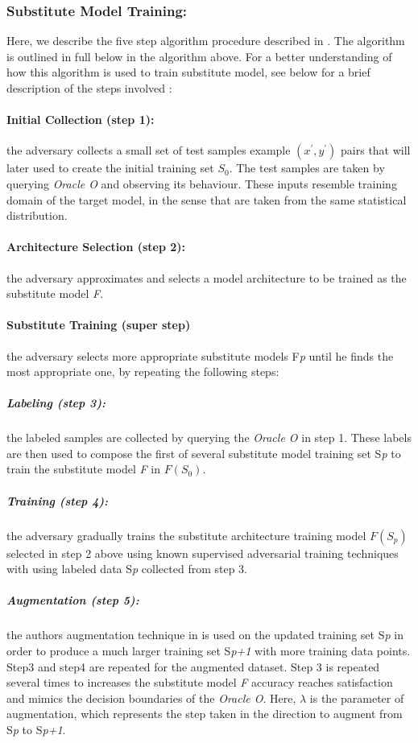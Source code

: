 \documentclass[grad,lot,lof,11pt,oneside,onehalfspace]{RUthesis}
\begin{document}
\subsubsection*{Substitute Model Training:} Here, we describe the five step algorithm procedure described in \cite{papernot_practical_2017}. The algorithm is outlined in full below in the algorithm above. For a better understanding of how this algorithm is used to train substitute model, see below for a brief description of the steps involved \cite{papernot_practical_2017}:
\paragraph{Initial Collection (step 1):} the adversary collects a small set of test samples example $(x^{'},y^{'})$ pairs that will later used to create the initial training set $S_{0}$. The test samples are taken by querying \textit{Oracle O} and observing its behaviour. These inputs resemble training domain of the target model, in the sense that are taken from the same statistical distribution.
\paragraph{Architecture Selection (step 2):} the adversary approximates and selects a model architecture to be trained as the substitute model \textit{F}.
\paragraph{Substitute Training (super step)} the adversary selects more appropriate substitute models F{\textit{p}} until he finds the most appropriate one, by repeating the following steps:
\subparagraph{Labeling (step 3):} the labeled samples are collected by querying the \textit{Oracle O} in step 1. These labels are then used to compose the first of several substitute model training set S{\textit{p}} to train the substitute model \textit{F} in \textit{$F(S_{0})$}.
\subparagraph{Training (step 4):} the adversary gradually trains the substitute architecture training model \textit{$F(S_{p})$} selected in step 2 above using known supervised adversarial training techniques with using labeled data S{\textit{p}} collected from step 3. 
\subparagraph{Augmentation (step 5):} the authors augmentation technique in \cite{papernot_practical_2017} is used on the updated training set S{\textit{p}} in order to produce a much larger training set S{\textit{p+1}} with more training data points. Step3 and step4 are repeated for the augmented dataset.  Step 3 is repeated several times to increases the substitute model \textit{F} accuracy reaches satisfaction and mimics the decision boundaries of the \textit{Oracle O}. Here, $\lambda$ is the parameter of augmentation, which represents the step taken in the direction to augment from S{\textit{p}} to S{\textit{p+1}}. 
\end{document}
